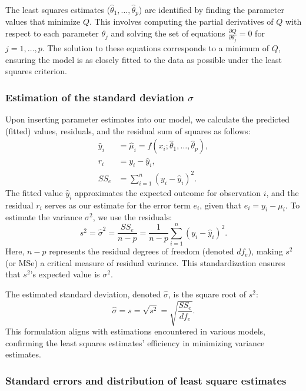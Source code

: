 \documentclass{article}
\begin{document}
The least squares estimates (\(\hat{\theta}_1, \ldots, \hat{\theta}_p\)) are identified by finding the parameter values that minimize \(Q\). This involves computing the partial derivatives of \(Q\) with respect to each parameter \(\theta_j\) and solving the set of equations \(\frac{\partial Q}{\partial \theta_j} = 0\) for \(j = 1, \ldots, p\). The solution to these equations corresponds to a minimum of \(Q\), ensuring the model is as closely fitted to the data as possible under the least squares criterion.

\subsubsection{Estimation of the standard deviation $\sigma$}

Upon inserting parameter estimates into our model, we calculate the predicted (fitted) values, residuals, and the residual sum of squares as follows:
\begin{align}
\hat{y}_i &= \hat{\mu}_i = f(x_i; \hat{\theta}_1, \ldots, \hat{\theta}_p), \\
r_i &= y_i - \hat{y}_i, \\
SS_e &= \sum_{i=1}^{n} (y_i - \hat{y}_i)^2. \tag{5.8}
\end{align}
The fitted value \(\hat{y}_i\) approximates the expected outcome for observation \(i\), and the residual \(r_i\) serves as our estimate for the error term \(e_i\), given that \(e_i = y_i - \mu_i\). To estimate the variance \(\sigma^2\), we use the residuals:
\begin{equation}
s^2 = \hat{\sigma}^2 = \frac{SS_e}{n - p} = \frac{1}{n - p} \sum_{i=1}^{n} (y_i - \hat{y}_i)^2. \tag{5.9}
\end{equation}
Here, \(n - p\) represents the residual degrees of freedom (denoted \(df_e\)), making \(s^2\) (or MSe) a critical measure of residual variance. This standardization ensures that \(s^2\)'s expected value is \(\sigma^2\).

The estimated standard deviation, denoted \(\hat{\sigma}\), is the square root of \(s^2\):
\begin{equation}
\hat{\sigma} = s = \sqrt{s^2} = \sqrt{\frac{SS_e}{df_e}}. \tag{5.10}
\end{equation}
This formulation aligns with estimations encountered in various models, confirming the least squares estimates' efficiency in minimizing variance estimates.


\subsubsection{Standard errors and distribution of least square estimates}
\end{document}
